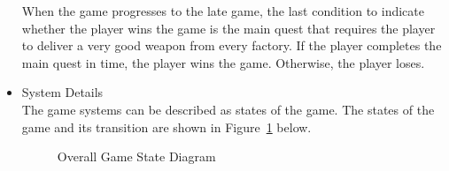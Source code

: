 \documentclass[12pt,oneside,openright,a4paper]{cpe-english-project}
\begin{document}
\begin{itemize}
\begin{minipage}[c]{\textwidth}\centering
{}
\label{fig:design-city}
\end{minipage}

When the game progresses to the late game, the last condition to indicate whether the player wins the game is the main quest that requires the player to deliver a very good weapon from every factory. If the player completes the main quest in time, the player wins the game. Otherwise, the player loses.

\item System Details \\
The game systems can be described as states of the game. The states of the game and its transition are shown in Figure~\ref{fig:design-state-diagram} below.

\begin{figure}[!h]\centering
{}
\caption{Overall Game State Diagram}
\label{fig:design-state-diagram}
\end{figure}


\end{itemize}
\end{document}
